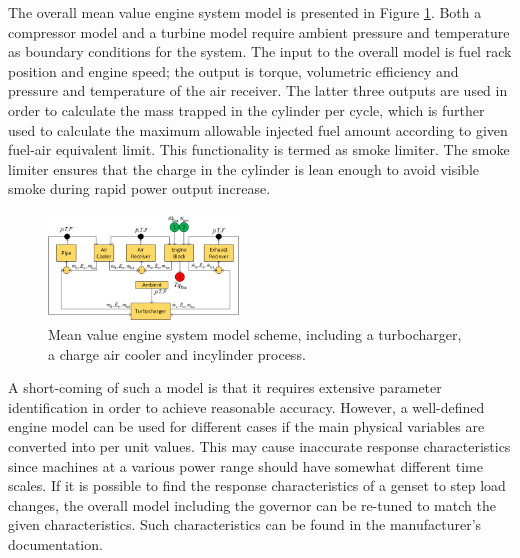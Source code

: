 \documentclass[twocolumn,10pt]{asme2e}
\begin{document}
%
The overall mean value engine system model is presented in Figure \ref{fig:MVEMscheme}.
Both a compressor model and a turbine model require ambient pressure and temperature as boundary conditions for the system. The input to the overall model is fuel rack position and engine speed; the output is torque, volumetric efficiency and pressure and temperature of the air receiver. 
The latter three outputs are used in order to calculate the mass trapped in the cylinder per cycle, which is further used to calculate the maximum allowable injected fuel amount according to given fuel-air equivalent limit. This functionality is termed as smoke limiter. 
The smoke limiter ensures that the charge in the cylinder is lean enough to avoid visible smoke during rapid power output increase. 
\begin{figure}
\normalsize
\centering
\includegraphics[width=0.45\textwidth]{./figures/MVEMScheme.png}
\caption{Mean value engine system model scheme, including a turbocharger, a charge air cooler and incylinder process.}
\label{fig:MVEMscheme}
\end{figure}

A short-coming of such a model is that it requires extensive parameter identification in order to achieve reasonable accuracy. However, a well-defined engine model can be used for different cases if the main physical variables are converted into per unit values. This may cause inaccurate response characteristics since machines at a various power range should have somewhat different time scales. If it is possible to find the response characteristics of a genset to step load changes, the overall model including the governor can be re-tuned to match the given characteristics. Such characteristics can be found in the manufacturer's documentation\cite{MANEnginesandSystems2013}.
\end{document}
